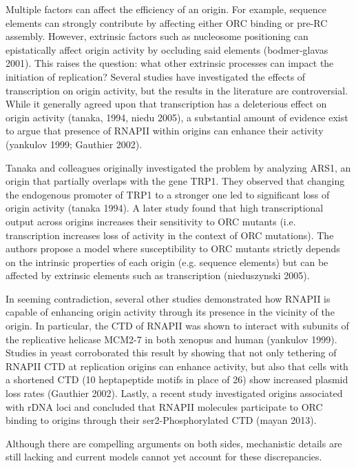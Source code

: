 Multiple factors can affect the efficiency of an origin.  For example, sequence elements can strongly contribute by affecting either ORC binding or pre-RC assembly. However, extrinsic factors such as nucleosome positioning can epistatically affect origin activity by occluding said elements (bodmer-glavas 2001). This raises the question: what other extrinsic processes can impact the initiation of replication? Several studies have investigated the effects of transcription on origin activity, but the results in the literature are controversial. While it generally agreed upon that transcription has a deleterious effect on origin activity (tanaka, 1994, niedu 2005), a substantial amount of evidence exist to argue that presence of RNAPII within origins can enhance their activity (yankulov 1999; Gauthier 2002). 

Tanaka and colleagues originally investigated the problem by analyzing ARS1, an origin that partially overlaps with the gene TRP1. They observed that changing the endogenous promoter of TRP1 to a stronger one led to significant loss of origin activity (tanaka 1994). A later study found that high transcriptional output across origins increases their sensitivity to ORC mutants (i.e. transcription increases loss of activity in the context of ORC mutations). The authors propose a model where susceptibility to ORC mutants strictly depends on the intrinsic properties of each origin (e.g. sequence elements) but can be affected by extrinsic elements such as transcription (nieduszynski 2005). 

In seeming contradiction, several other studies demonstrated how RNAPII is capable of enhancing origin activity through its presence in the vicinity of the origin. In particular, the CTD of RNAPII was shown to interact with subunits of the replicative helicase MCM2-7 in both xenopus and human (yankulov 1999). Studies in yeast corroborated this result by showing that not only tethering of RNAPII CTD at replication origins can enhance activity, but also that cells with a shortened CTD (10 heptapeptide motifs in place of 26) show increased plasmid loss rates (Gauthier 2002). Lastly, a recent study investigated origins associated with rDNA loci and concluded that RNAPII molecules participate to ORC binding to origins through their  ser2-Phosphorylated CTD (mayan 2013). 

Although there are compelling arguments on both sides, mechanistic details are still lacking and current models cannot yet account for these discrepancies.










